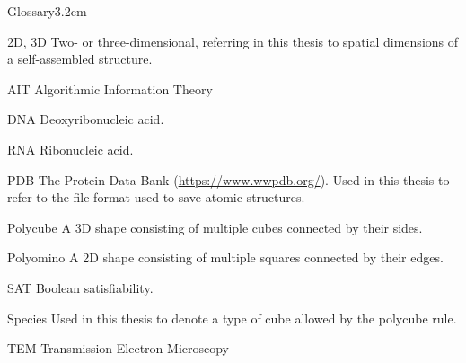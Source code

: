 \begin{mclistof}{Glossary}{3.2cm}

\item[2D, 3D] Two- or three-dimensional, referring in this thesis to spatial dimensions of a self-assembled structure.
\item[AIT] Algorithmic Information Theory
\item[DNA] Deoxyribonucleic acid.
\item[RNA] Ribonucleic acid.
\item[PDB] The Protein Data Bank (\url{https://www.wwpdb.org/}). Used in this thesis to refer to the file format used to save atomic structures.
\item[Polycube] A 3D shape consisting of multiple cubes connected by their sides.
\item[Polyomino] A 2D shape consisting of multiple squares connected by their edges.
\item[SAT] Boolean satisfiability.
\item[Species] Used in this thesis to denote a type of cube allowed by the polycube rule.
\item[TEM] Transmission Electron Microscopy 

\end{mclistof} 
